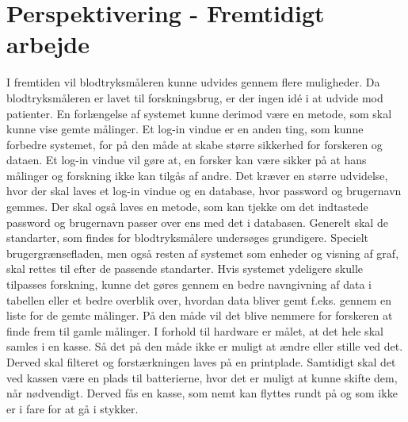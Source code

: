\section{Perspektivering - Fremtidigt arbejde}
I fremtiden vil blodtryksmåleren kunne udvides gennem flere muligheder. Da blodtryksmåleren er lavet til forskningsbrug, er der ingen idé i at udvide mod patienter.  En forlængelse af systemet kunne derimod være en metode, som skal kunne vise gemte målinger. \newline Et log-in vindue er en anden ting, som kunne forbedre systemet, for på den måde at skabe større sikkerhed for forskeren og dataen. Et log-in vindue vil gøre at, en forsker kan være sikker på at hans målinger og forskning ikke kan tilgås af andre. Det kræver en større udvidelse, hvor der skal laves et log-in vindue og en database, hvor password og brugernavn gemmes. Der skal også laves en metode, som kan tjekke om det indtastede password og brugernavn passer over ens med det i databasen. 
\newline
Generelt skal de standarter, som findes for blodtryksmålere undersøges grundigere. Specielt brugergrænsefladen, men også resten af systemet som enheder og visning af graf, skal rettes til efter de passende standarter.
\newline 
Hvis systemet ydeligere skulle tilpasses forskning, kunne det gøres gennem en bedre navngivning af data i tabellen eller et bedre overblik over, hvordan data bliver gemt f.eks. gennem en liste for de gemte målinger. På den måde vil det blive nemmere for forskeren at finde frem til gamle målinger.   
\newline 
I forhold til hardware er målet, at det hele skal samles i en kasse. Så det på den måde ikke er muligt at ændre eller stille ved det. Derved skal filteret og forstærkningen laves på en printplade. Samtidigt skal det ved kassen være en plads til batterierne, hvor det er muligt at kunne skifte dem, når nødvendigt. Derved fås en kasse, som nemt kan flyttes rundt på og som ikke er i fare for at gå i stykker.   
